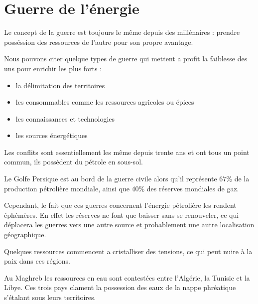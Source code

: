 \section{Guerre de l'énergie}
\vskip -15pt

Le concept de la guerre est toujours le même depuis des millénaires : prendre posséssion des
ressources de l'autre pour son propre avantage.

Nous pouvons citer quelque types de guerre qui mettent a profit la faiblesse des uns
pour enrichir les plus forts :

\begin{itemize}
  \item la délimitation des territoires %
  \item les consommables comme les ressources agricoles ou épices
  \item les connaissances et technologies
  \item les sources énergétiques
\end{itemize}

Les conflits sont essentiellement les même depuis trente ans et ont tous un point commun,
ils possèdent du pétrole en sous-sol.

Le Golfe Persique est au bord de la guerre civile alors qu'il représente 67\%
de la production pétrolière mondiale, ainsi que 40\% des réserves mondiales de gaz.

Cependant, le fait que ces guerres concernent l'énergie pétrolière les rendent éphémères.
En effet les réserves ne font que baisser sans se renouveler, ce qui déplacera les
guerres vers une autre source et probablement une autre localisation géographique.

Quelques ressources commencent a cristalliser des tensions, ce qui peut nuire à la paix
dans ces régions.

Au Maghreb les ressources en eau sont contestées entre l'Algérie, la Tunisie et la Libye. Ces
trois pays clament la possession des eaux de la nappe phréatique s'étalant sous leurs
territoires.

